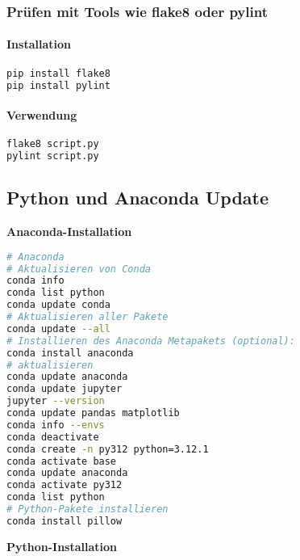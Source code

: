 \documentclass{vorlage-design-main}
\begin{document}
\hypertarget{pruxfcfen-mit-tools-wie-flake8-oder-pylint}{%
\subsubsection{Prüfen mit Tools wie flake8 oder
pylint}\label{pruefen-mit-tools-wie-flake8-oder-pylint}}

\hypertarget{installation}{%
\paragraph{Installation}\label{installation}}

\begin{lstlisting}[language=bash]
pip install flake8
pip install pylint
\end{lstlisting}

\hypertarget{verwendung}{%
\paragraph{Verwendung}\label{verwendung}}

\begin{lstlisting}[language=bash]
flake8 script.py
pylint script.py
\end{lstlisting}

\hypertarget{python-und-anaconda-update}{%
\subsection{Python und Anaconda
Update}\label{python-und-anaconda-update}}

\textbf{Anaconda-Installation}

\begin{lstlisting}[language=bash]
# Anaconda
# Aktualisieren von Conda
conda info
conda list python
conda update conda
# Aktualisieren aller Pakete
conda update --all
# Installieren des Anaconda Metapakets (optional):
conda install anaconda
# aktualisieren
conda update anaconda
conda update jupyter
jupyter --version
conda update pandas matplotlib
conda info --envs
conda deactivate
conda create -n py312 python=3.12.1
conda activate base
conda update anaconda
conda activate py312
conda list python
# Python-Pakete installieren
conda install pillow
\end{lstlisting}

\textbf{Python-Installation}
\end{document}

